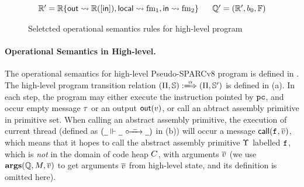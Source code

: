 \begin{figure*}[!t]
{\begin{minipage}[b]{1\textwidth}
\[\begin{array}{c}
{\begin{array}{c}
                        \\ 
                        \hRfile' = \hRfile\{ \outRN \rightsquigarrow 
                            \hRfile([\inRN]), \localRN \rightsquigarrow \fm_1, 
                            \inRN \rightsquigarrow \fm_2 \} \quad \ \ 
                        \hRstate' = (\hRfile', \block_0, \hWstk)
                    \end{array}
                }
            \end{array}        
        \]
        \vspace{0.2em}
        \end{minipage}
    } 
    \caption{Seletcted operational semantics rules for high-level program}
    \label{fig:selected-opsem-high-level-prog}
\end{figure*}

\paragraph{\textbf{Operational Semantics in High-level.}} 
The operational semantics for high-level Pseudo-SPARCv8 program 
is defined in \Fig{\ref{fig:selected-opsem-high-level-prog}}. 
The high-level program transition relation 
$\HGlobTrans{(\HMd, \hpstate)}{\hmsg}{(\HMd, \hpstate')}$ is defined 
in \Fig{\ref{fig:selected-opsem-high-level-prog}} (a). In each step, 
the program may either execute the instruction pointed by $\texttt{pc}$,  
and occur empty message $\tau$ or an output $\textsf{out}({v})$, 
or call  an abtract assembly primitive in primitive set.
When calling an abstract assembly primitive, 
the execution of current thread (defined as 
$({\underline{\ \,}} \Vdash {\underline{\ \,}} \ \circ\mkern-7mu\xrightarrow{\ \underline{\ \,} \ } {\underline{\ \,}})$ in 
\Fig{\ref{fig:selected-opsem-high-level-prog}} (b)) will occur 
a message $\textsf{call}({\texttt{f}_{}, \overline{v}})$, which means that it 
hopes to call the abstract assembly primitive $\Upsilon$ labelled 
$\texttt{f}_{}$, which is {\it not} in the domain of code heap $C$, 
with arguments $\overline{v}$ 
(we use $\textbf{args}(\mathbb{Q}, M, \overline{v})$ 
to get arguments $\overline{v}$ 
from high-level state, and its definition is omitted here). 

